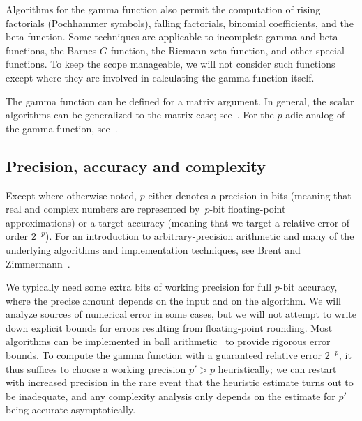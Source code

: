 \documentclass[reqno]{amsart}
\theoremstyle{definition}
\begin{document}
Algorithms for the gamma function also
permit the computation of rising factorials (Pochhammer symbols),
falling factorials,
binomial coefficients,
and the beta function.
Some techniques are applicable to
incomplete gamma and beta functions,
the Barnes $G$-function, the Riemann zeta function,
and other special functions.
To keep the scope manageable,
we will not consider such functions except where
they are involved in calculating the gamma function itself.

The gamma function can be defined for a matrix argument.
In general, the scalar algorithms can be generalized
to the matrix case; see~\cite{Cardoso2019,Miyajima2020}.
For the $p$-adic analog of the gamma function, see~\cite{villegas2007experimental}.


\subsection{Precision, accuracy and complexity}

Except where otherwise noted, $p$ either denotes a precision in bits
(meaning that real and complex numbers are represented by~$p$-bit
floating-point approximations) or a target accuracy (meaning
that we target a relative error of order $2^{-p}$).
For an introduction to arbitrary-precision arithmetic and many
of the underlying algorithms and implementation techniques,
see Brent and Zimmermann~\cite{mca}.

We typically need some extra bits of working precision for full $p$-bit accuracy,
where the precise amount depends on the input and
on the algorithm.
We will analyze sources of numerical error in some cases,
but we will not attempt to write down explicit bounds for errors
resulting from floating-point rounding.
Most algorithms can be implemented in ball arithmetic~\cite{vdH:ball,Joh2017}
to provide rigorous error bounds.
To compute the gamma function with a guaranteed relative error
$2^{-p}$, it thus suffices to choose
a working precision $p' > p$ heuristically;
we can restart with increased precision in the rare event that the
heuristic estimate turns out to be inadequate, and any complexity
analysis only depends on the estimate for $p'$ being accurate asymptotically.

\end{document}
